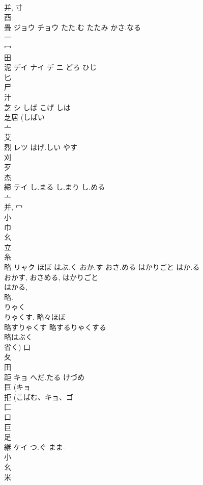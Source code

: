 \documentclass[8pt]{extreport}
\begin{document}
\begin{CJK}{UTF8}{min}
\\	并, 寸 
\\	酉 
\\	畳	ジョウ チョウ	たた.む たたみ かさ.なる	
\\	一 
\\	冖 
\\	田 
\\	泥	デイ ナイ デ ニ	どろ ひじ	
\\	匕 
\\	尸 
\\	汁 
\\	芝	シ	しば こげ しは	
\\	芝居 (しばい 
\\	亠 
\\	艾 
\\	烈	レツ	はげ.しい やす	
\\	刈 
\\	歹 
\\	杰	
\\	締	テイ	し.まる し.まり し.める	
\\	亠 
\\	并, 冖 
\\	小 
\\	巾 
\\	幺 
\\	立 
\\	糸 
\\	略	リャク	ほぼ はぶ.く おか.す おさ.める はかりごと はか.る	
\\	おかす, おさめる, はかりごと 
\\	はかる, 
\\	略. 
\\	りゃく 
\\	りゃくす.		略々ほぼ 
\\	略すりゃくす 略するりゃくする 
\\	略はぶく 
\\	省く)	口 
\\	夂 
\\	田 
\\	距	キョ	へだ.たる けづめ	
\\	巨 (キョ 
\\	拒 (こばむ、キョ、ゴ 
\\	匚 
\\	口 
\\	巨 
\\	足 
\\	継	ケイ	つ.ぐ まま-	
\\	小 
\\	幺 
\\	米 

\end{CJK}
\end{document}
